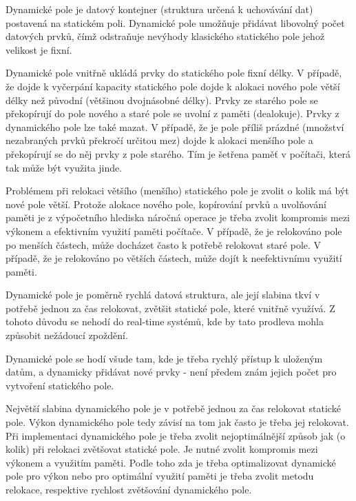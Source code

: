 
Dynamické pole je datový kontejner (struktura určená k uchovávání dat) postavená na statickém poli. Dynamické pole umožňuje přidávat libovolný počet datových prvků, čímž odstraňuje nevýhody klasického statického pole jehož velikost je fixní. 

Dynamické pole vnitřně ukládá prvky do statického pole fixní délky. V případě, že dojde k vyčerpání kapacity statického pole dojde k alokaci nového pole větší délky než původní (většinou dvojnásobné délky). Prvky ze starého pole se překopírují do pole nového a staré pole se uvolní z paměti (dealokuje). Prvky z dynamického pole lze také mazat. V případě, že je pole příliš prázdné (množství nezabraných prvků překročí určitou mez) dojde k alokaci menšího pole a překopírují se do něj prvky z pole starého. Tím je šetřena paměť v počítači, která tak může být využita jinde. 

Problémem při relokaci většího (menšího) statického pole je zvolit o kolik má být nové pole větší. Protože alokace nového pole, kopírování prvků a uvolňování paměti je z výpočetního hlediska náročná operace je třeba zvolit kompromis mezi výkonem a efektivním využití paměti počítače. V případě, že je relokováno pole po menších částech, může docházet často k potřebě relokovat staré pole. V případě, že je relokováno po větších částech, může dojít k neefektivnímu využití paměti. 

Dynamické pole je poměrně rychlá datová struktura, ale její slabina tkví v potřebě jednou za čas relokovat, zvětšit statické pole, které vnitřně využívá. Z tohoto důvodu se nehodí do real-time systémů, kde by tato prodleva mohla způsobit nežádoucí zpoždění.

Dynamické pole se hodí všude tam, kde je třeba rychlý přístup k uloženým datům, a dynamicky přidávat nové prvky - není předem znám jejich počet pro vytvoření statického pole. 


Největší slabina dynamického pole je v potřebě jednou za čas relokovat statické pole. Výkon dynamického pole tedy závisí na tom jak často je třeba jej relokovat. Při implementaci dynamického pole je třeba zvolit nejoptimálnější způsob jak (o kolik) při relokaci zvětšovat statické pole. Je nutné zvolit kompromis mezi výkonem a využitím paměti. Podle toho zda je třeba optimalizovat dynamické pole pro výkon nebo pro optimální využití paměti je třeba zvolit metodu relokace, respektive rychlost zvětšování dynamického pole. 


